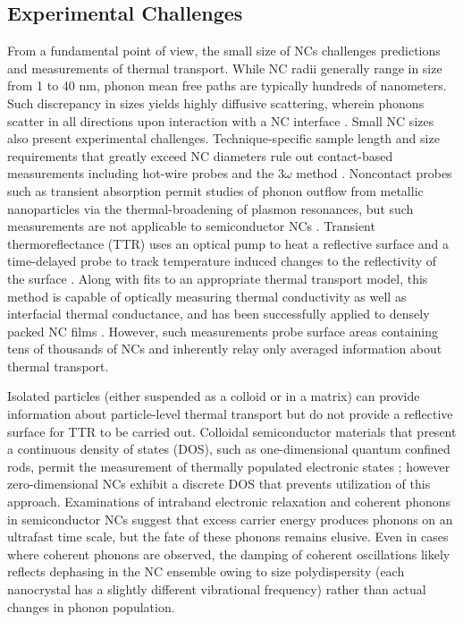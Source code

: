 \subsection{Experimental Challenges}

From a fundamental point of view, the small size of NCs challenges predictions and measurements of thermal transport. While NC radii generally range in size from 1 to 40 nm, phonon mean free paths are typically hundreds of nanometers. Such discrepancy in sizes yields highly diffusive scattering, wherein phonons scatter in all directions upon interaction with a NC interface \cite{chen2000particularities}. Small NC sizes also present experimental challenges.  Technique-specific sample length and size requirements that greatly exceed NC diameters rule out contact-based measurements including hot-wire probes and the $3\omega$ method \cite{chen2000particularities, PhysRevLett.95.065502}. Noncontact probes such as transient absorption permit studies of phonon outflow from metallic nanoparticles via the thermal-broadening of plasmon resonances, but such measurements are not applicable to semiconductor NCs \cite{pelton2009damping,doi:10.1021/jp020581+,pelton2009damping}. Transient thermoreflectance (TTR) uses an optical pump to heat a reflective surface and a time-delayed probe to track temperature induced changes to the reflectivity of the surface \cite{paddock1986transient}. Along with fits to an appropriate thermal transport model, this method is capable of optically measuring thermal conductivity as well as interfacial thermal conductance, and has been successfully applied to densely packed NC films \cite{ong2013surface}. However, such measurements probe surface areas containing tens of thousands of NCs and inherently relay only averaged information about thermal transport. \par

Isolated particles (either suspended as a colloid or in a matrix) can provide information about particle-level thermal transport but do not provide a reflective surface for TTR to be carried out. Colloidal semiconductor materials that present a continuous density of states (DOS), such as one-dimensional quantum confined rods, permit the measurement of thermally populated electronic states \cite{achermann2006effect}; however zero-dimensional NCs exhibit a discrete DOS that prevents utilization of this approach. Examinations of intraband electronic relaxation \cite{PhysRevB.60.R2181,PhysRevLett.80.4028} and coherent phonons \cite{1464-4258-10-6-064004,PhysRevLett.79.5102,PhysRevB.77.235321} in semiconductor NCs suggest that excess carrier energy produces phonons on an ultrafast time scale, but the fate of these phonons remains elusive. Even in cases where coherent phonons are observed, the damping of coherent oscillations likely reflects dephasing in the NC ensemble owing to size polydispersity (each nanocrystal has a slightly different vibrational frequency) rather than actual changes in phonon population.

